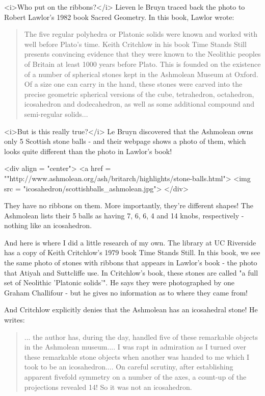 <i>Who put on the ribbons?</i>  Lieven le Bruyn traced back the photo to 
Robert Lawlor's 1982 book Sacred Geometry.  In this book, Lawlor wrote:

\begin{quote}
   The five regular polyhedra or Platonic solids were known and 
   worked with well before Plato's time.  Keith Critchlow in his 
   book Time Stands Still presents convincing evidence that they 
   were known to the Neolithic peoples of Britain at least 1000 
   years before Plato.  This is founded on the existence of a number 
   of spherical stones kept in the Ashmolean Museum at Oxford. 
   Of a size one can carry in the hand, these stones were carved into 
   the precise geometric spherical versions of the cube, tetrahedron, 
   octahedron, icosahedron and dodecahedron, as well as some additional
   compound and semi-regular solids... 
\end{quote}

<i>But is this really true?</i>  Le Bruyn discovered that the Ashmolean owns 
only 5 Scottish stone balls - and their webpage shows a photo of them,
which looks quite different than the photo in Lawlor's book!  

<div align = "center">
<a href = ""http://www.ashmolean.org/ash/britarch/highlights/stone-balls.html">
<img src = "icosahedron/scottishballs_ashmolean.jpg">
</div>

They have no ribbons on them.  More importantly, they're different
shapes!  The Ashmolean lists their 5 balls as having 7, 6, 6, 4 and 14
knobs, respectively - nothing like an icosahedron.

And here is where I did a little research of my own.  The library 
at UC Riverside has a copy of Keith Critchlow's 1979 book Time 
Stands Still.  In this book, we see the same photo of stones with 
ribbons that appears in Lawlor's book - the photo that Atiyah and 
Suttcliffe use.  In Critchlow's book, these stones are called "a full 
set of Neolithic 'Platonic solids'".  He says they were photographed 
by one Graham Challifour - but he gives no information as to where 
they came from!

And Critchlow explicitly denies that the Ashmolean has an icosahedral
stone!  He writes:

\begin{quote}
   ... the author has, during the day, handled five of these 
   remarkable objects in the Ashmolean museum.... I was rapt 
   in admiration as I turned over these remarkable stone objects 
   when another was handed to me which I took to be an icosahedron.... 
   On careful scrutiny, after establishing apparent fivefold symmetry 
   on a number of the axes, a count-up of the projections revealed 14! 
   So it was not an icosahedron. 
\end{quote}

